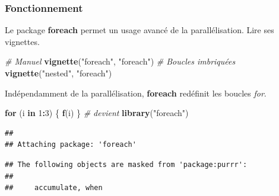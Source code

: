 \documentclass[
  12pt,
  french,
  a4paper,
  extrafontsizes,onecolumn,openright
  ]{memoir}
\newenvironment{Shaded}{\begin{snugshade}}{\end{snugshade}}
\newcommand{\CommentTok}[1]{\textcolor[rgb]{0.56,0.35,0.01}{\textit{#1}}}
\newcommand{\ControlFlowTok}[1]{\textcolor[rgb]{0.13,0.29,0.53}{\textbf{#1}}}
\newcommand{\DataTypeTok}[1]{\textcolor[rgb]{0.13,0.29,0.53}{#1}}
\newcommand{\DecValTok}[1]{\textcolor[rgb]{0.00,0.00,0.81}{#1}}
\newcommand{\KeywordTok}[1]{\textcolor[rgb]{0.13,0.29,0.53}{\textbf{#1}}}
\newcommand{\NormalTok}[1]{#1}
\newcommand{\OperatorTok}[1]{\textcolor[rgb]{0.81,0.36,0.00}{\textbf{#1}}}
\newcommand{\StringTok}[1]{\textcolor[rgb]{0.31,0.60,0.02}{#1}}
\begin{document}
\hypertarget{fonctionnement}{%
\subsubsection{Fonctionnement}\label{fonctionnement}}

Le package \textbf{foreach} permet un usage avancé de la parallélisation.
Lire ses vignettes.

\scriptsize

\begin{Shaded}
\begin{Highlighting}[]
\CommentTok{# Manuel}
\KeywordTok{vignette}\NormalTok{(}\StringTok{"foreach"}\NormalTok{, }\StringTok{"foreach"}\NormalTok{)}
\CommentTok{# Boucles imbriquées}
\KeywordTok{vignette}\NormalTok{(}\StringTok{"nested"}\NormalTok{, }\StringTok{"foreach"}\NormalTok{)}
\end{Highlighting}
\end{Shaded}

\normalsize

Indépendamment de la parallélisation, \textbf{foreach} redéfinit les boucles \emph{for}.

\scriptsize

\begin{Shaded}
\begin{Highlighting}[]
\ControlFlowTok{for}\NormalTok{ (i }\ControlFlowTok{in} \DecValTok{1}\OperatorTok{:}\DecValTok{3}\NormalTok{) \{}
    \KeywordTok{f}\NormalTok{(i)}
\NormalTok{\}}
\CommentTok{# devient}
\KeywordTok{library}\NormalTok{(}\StringTok{"foreach"}\NormalTok{)}
\end{Highlighting}
\end{Shaded}

\begin{verbatim}
## 
## Attaching package: 'foreach'
\end{verbatim}

\begin{verbatim}
## The following objects are masked from 'package:purrr':
## 
##     accumulate, when
\end{verbatim}

\begin{Shaded}
\end{Shaded}
\end{document}

